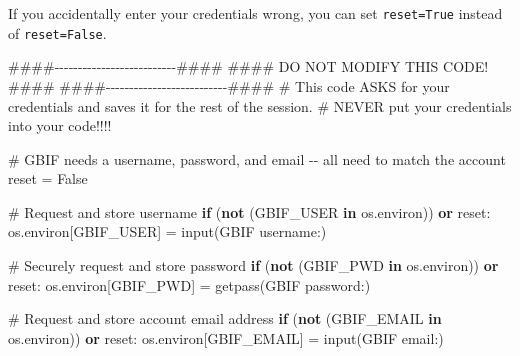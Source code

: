 \documentclass[
  letterpaper,
  DIV=11,
  numbers=noendperiod,
  oneside]{scrreprt}
\newenvironment{Shaded}{\begin{snugshade}}{\end{snugshade}}
\newcommand{\BuiltInTok}[1]{\textcolor[rgb]{0.00,0.23,0.31}{#1}}
\newcommand{\CommentTok}[1]{\textcolor[rgb]{0.37,0.37,0.37}{#1}}
\newcommand{\ControlFlowTok}[1]{\textcolor[rgb]{0.00,0.23,0.31}{\textbf{#1}}}
\newcommand{\KeywordTok}[1]{\textcolor[rgb]{0.00,0.23,0.31}{\textbf{#1}}}
\newcommand{\NormalTok}[1]{\textcolor[rgb]{0.00,0.23,0.31}{#1}}
\newcommand{\OperatorTok}[1]{\textcolor[rgb]{0.37,0.37,0.37}{#1}}
\newcommand{\StringTok}[1]{\textcolor[rgb]{0.13,0.47,0.30}{#1}}
\newcommand{\VariableTok}[1]{\textcolor[rgb]{0.07,0.07,0.07}{#1}}
\begin{document}
\begin{tcolorbox}[enhanced jigsaw, colbacktitle=quarto-callout-tip-color!10!white, opacityback=0, bottomtitle=1mm, toptitle=1mm, bottomrule=.15mm, left=2mm, colframe=quarto-callout-tip-color-frame, leftrule=.75mm, opacitybacktitle=0.6, colback=white, rightrule=.15mm, toprule=.15mm, breakable, titlerule=0mm, title=\textcolor{quarto-callout-tip-color}{\faLightbulb}\hspace{0.5em}{Tip}, coltitle=black, arc=.35mm]

If you accidentally enter your credentials wrong, you can set
\texttt{reset=True} instead of \texttt{reset=False}.

\end{tcolorbox}

\begin{Shaded}
\begin{Highlighting}[]
\CommentTok{\#\#\#\#{-}{-}{-}{-}{-}{-}{-}{-}{-}{-}{-}{-}{-}{-}{-}{-}{-}{-}{-}{-}{-}{-}{-}{-}{-}{-}\#\#\#\#}
\CommentTok{\#\#\#\# DO NOT MODIFY THIS CODE! \#\#\#\#}
\CommentTok{\#\#\#\#{-}{-}{-}{-}{-}{-}{-}{-}{-}{-}{-}{-}{-}{-}{-}{-}{-}{-}{-}{-}{-}{-}{-}{-}{-}{-}\#\#\#\#}
\CommentTok{\# This code ASKS for your credentials and saves it for the rest of the session.}
\CommentTok{\# NEVER put your credentials into your code!!!!}

\CommentTok{\# GBIF needs a username, password, and email {-}{-} all need to match the account}
\NormalTok{reset }\OperatorTok{=} \VariableTok{False}

\CommentTok{\# Request and store username}
\ControlFlowTok{if}\NormalTok{ (}\KeywordTok{not}\NormalTok{ (}\StringTok{\textquotesingle{}GBIF\_USER\textquotesingle{}}  \KeywordTok{in}\NormalTok{ os.environ)) }\KeywordTok{or}\NormalTok{ reset:}
\NormalTok{    os.environ[}\StringTok{\textquotesingle{}GBIF\_USER\textquotesingle{}}\NormalTok{] }\OperatorTok{=} \BuiltInTok{input}\NormalTok{(}\StringTok{\textquotesingle{}GBIF username:\textquotesingle{}}\NormalTok{)}

\CommentTok{\# Securely request and store password}
\ControlFlowTok{if}\NormalTok{ (}\KeywordTok{not}\NormalTok{ (}\StringTok{\textquotesingle{}GBIF\_PWD\textquotesingle{}}  \KeywordTok{in}\NormalTok{ os.environ)) }\KeywordTok{or}\NormalTok{ reset:}
\NormalTok{    os.environ[}\StringTok{\textquotesingle{}GBIF\_PWD\textquotesingle{}}\NormalTok{] }\OperatorTok{=}\NormalTok{ getpass(}\StringTok{\textquotesingle{}GBIF password:\textquotesingle{}}\NormalTok{)}
    
\CommentTok{\# Request and store account email address}
\ControlFlowTok{if}\NormalTok{ (}\KeywordTok{not}\NormalTok{ (}\StringTok{\textquotesingle{}GBIF\_EMAIL\textquotesingle{}}  \KeywordTok{in}\NormalTok{ os.environ)) }\KeywordTok{or}\NormalTok{ reset:}
\NormalTok{    os.environ[}\StringTok{\textquotesingle{}GBIF\_EMAIL\textquotesingle{}}\NormalTok{] }\OperatorTok{=} \BuiltInTok{input}\NormalTok{(}\StringTok{\textquotesingle{}GBIF email:\textquotesingle{}}\NormalTok{)}
\end{Highlighting}
\end{Shaded}
\end{document}
